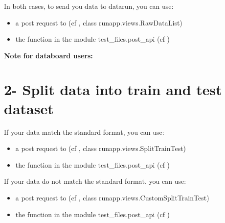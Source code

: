 \documentclass[letterpaper,10pt,english]{sphinxmanual}
\begin{document}
In both cases, to send you data to datarun, you can use:
\begin{itemize}
\item {} 
a post request to  (cf {\hyperref[modules/views:requestsdirect]{}}, class runapp.views.RawDataList)

\item {} 
the  function in the module test\_files.post\_api (cf {\hyperref[modules/views:requestsmodule]{}})

\end{itemize}

\textbf{Note for databoard users:}


\section{2- Split data into train and test dataset}
\label{modules/workflow:split-data-into-train-and-test-dataset}
If your data match the standard format, you can use:
\begin{itemize}
\item {} 
a post request to  (cf {\hyperref[modules/views:requestsdirect]{}}, class runapp.views.SplitTrainTest)

\item {} 
the  function in the module test\_files.post\_api (cf {\hyperref[modules/views:requestsmodule]{}})

\end{itemize}

If your data do not match the standard format, you can use:
\begin{itemize}
\item {} 
a post request to  (cf {\hyperref[modules/views:requestsdirect]{}}, class runapp.views.CustomSplitTrainTest)

\item {} 
the  function in the module test\_files.post\_api (cf {\hyperref[modules/views:requestsmodule]{}})

\end{itemize}
\end{document}
